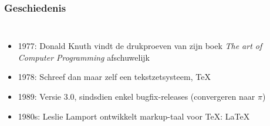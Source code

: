 \documentclass[aspectratio=169]{beamer}
\begin{document}
\begin{frame}
  \frametitle{Geschiedenis}

  \begin{columns}[c]

    \begin{itemize}
    \item<+-> 1977: Donald Knuth vindt de drukproeven van zijn boek \emph{The art of Computer Programming} afschuwelijk
    \item<+-> 1978: Schreef dan maar zelf een tekstzetsysteem, {\TeX}
    \item<+-> 1989: Versie 3.0, sindsdien enkel bugfix-releases (convergeren naar $\pi$)
    \item<+-> 1980s: Leslie Lamport ontwikkelt markup-taal voor {\TeX}: {\LaTeX}
    \end{itemize}


\end{columns}
\end{frame}
\end{document}

